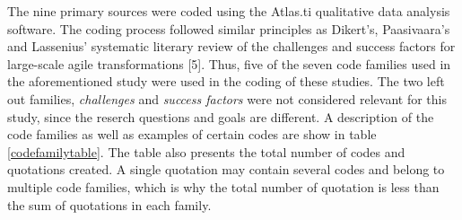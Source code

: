 The nine primary sources were coded using the Atlas.ti qualitative data
analysis software. The coding process followed similar principles as
Dikert's, Paasivaara's and Lassenius' systematic literary review of the
challenges and success factors for large-scale agile transformations
[5]. Thus, five of the seven code families used in the aforementioned
study were used in the coding of these studies. The two left out
families, \textit{challenges} and \textit{success factors} were not
considered relevant for this study, since the reserch questions and
goals are different. A description of the code families as well as
examples of certain codes are show in table \ref{codefamilytable}. The table also presents
the total number of codes and quotations created. A single quotation may
contain several codes and belong to multiple code families, which is why
the total number of quotation is less than the sum of quotations in each
family.

\bigskip

\bigskip
